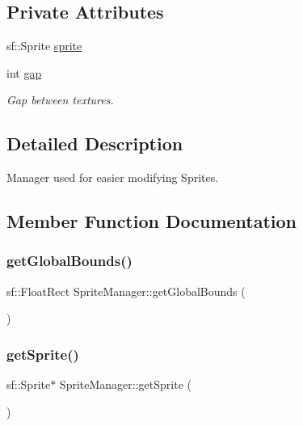 \subsection*{Private Attributes}
\begin{DoxyCompactItemize}
\item 
sf\+::\+Sprite \mbox{\hyperlink{class_sprite_manager_aaa4c24e6db93bef8a28b38cb8de839c1}{sprite}}
\item 
int \mbox{\hyperlink{class_sprite_manager_a57bba66a27411c59651af826b50ec11d}{gap}}
\begin{DoxyCompactList}\small\item\em Gap between textures. \end{DoxyCompactList}\end{DoxyCompactItemize}


\subsection{Detailed Description}
Manager used for easier modifying Sprites. 

\subsection{Member Function Documentation}
\mbox{\label{class_sprite_manager_af4b1373fb34c1bf091e5023fe52c1bc0}} 
\subsubsection{\texorpdfstring{getGlobalBounds()}{getGlobalBounds()}}
{\footnotesize\ttfamily sf\+::\+Float\+Rect Sprite\+Manager\+::get\+Global\+Bounds (\begin{DoxyParamCaption}{ }\end{DoxyParamCaption})\hspace{0.3cm}{\ttfamily [inline]}}

\mbox{\label{class_sprite_manager_a9c0af555f22c9ea83a07ae3d1818db0e}} 
\subsubsection{\texorpdfstring{getSprite()}{getSprite()}}
{\footnotesize\ttfamily sf\+::\+Sprite$\ast$ Sprite\+Manager\+::get\+Sprite (\begin{DoxyParamCaption}{ }\end{DoxyParamCaption})\hspace{0.3cm}{\ttfamily [inline]}}

